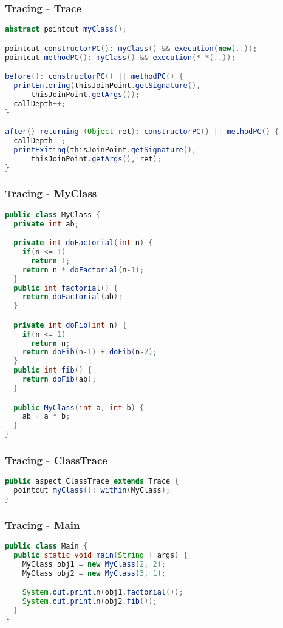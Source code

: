 \documentclass[11pt]{beamer}
\begin{document}
\begin{frame}[fragile]
   \frametitle{Tracing - Trace}
   {\scriptsize
   \begin{lstlisting}[language=java]
abstract pointcut myClass();

pointcut constructorPC(): myClass() && execution(new(..));
pointcut methodPC(): myClass() && execution(* *(..));

before(): constructorPC() || methodPC() {
  printEntering(thisJoinPoint.getSignature(),
      thisJoinPoint.getArgs());
  callDepth++;
}

after() returning (Object ret): constructorPC() || methodPC() {
  callDepth--;
  printExiting(thisJoinPoint.getSignature(),
      thisJoinPoint.getArgs(), ret);
}
   \end{lstlisting}}
\end{frame}

\begin{frame}[fragile]
   \frametitle{Tracing - MyClass}
   {\tiny
   \begin{lstlisting}[language=java]
public class MyClass {
  private int ab;

  private int doFactorial(int n) {
    if(n <= 1)
      return 1;
    return n * doFactorial(n-1);
  }
  public int factorial() {
    return doFactorial(ab);
  }

  private int doFib(int n) {
    if(n <= 1)
      return n;
    return doFib(n-1) + doFib(n-2);
  }
  public int fib() {
    return doFib(ab);
  }

  public MyClass(int a, int b) {
    ab = a * b;
  }
}
   \end{lstlisting}}
\end{frame}

\begin{frame}[fragile]
   \frametitle{Tracing - ClassTrace}
   {\small
   \begin{lstlisting}[language=java]
public aspect ClassTrace extends Trace {
  pointcut myClass(): within(MyClass);
}
   \end{lstlisting}}
\end{frame}

\begin{frame}[fragile]
   \frametitle{Tracing - Main}
   {\footnotesize
   \begin{lstlisting}[language=java]
public class Main {
  public static void main(String[] args) {
    MyClass obj1 = new MyClass(2, 2);
    MyClass obj2 = new MyClass(3, 1);

    System.out.println(obj1.factorial());
    System.out.println(obj2.fib());
  }
}
   \end{lstlisting}}
\end{frame}
\end{document}
